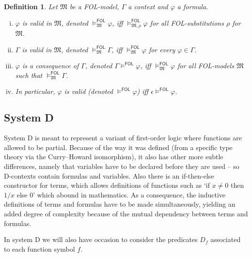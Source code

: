 \documentclass{article}
\newtheorem{definition}{Definition}[section]
\newcommand{\D}{\textsf D}
\newcommand{\FOL}{\textsf{FOL}}
\newcommand{\ifte}{\textsf{if-then-else}}
\newcommand{\mymodels}[1]{\ensuremath{\models^{\mathsf{#1}}}}
\newcommand{\mymodelsm}[2]{\ensuremath{\models_{\mathfrak{#2}}^{\mathsf{#1}}}}
\newcommand{\mymodelss}[3]{\ensuremath{\models_{\mathfrak{#2},{#3}}^{\mathsf{#1}}}}
\newcommand{\yields}[1]{\ensuremath{\models^{\mathsf{#1}}}}
\begin{document}
\begin{definition}\label{defn:FOLvalidity}\label{defn:FOLconsequence}
Let $\mathfrak M$ be a {\FOL}-model, $\Gamma$ a context and $\varphi$
a formula.
\begin{enumerate}[(i)]
\item $\varphi$ is valid in $\mathfrak M$, denoted
$\mymodelsm{FOL}M\varphi$, iff $\mymodelss{FOL}M\rho\varphi$ for all
{\FOL}-substitutions $\rho$ for $\mathfrak M$.
\item $\Gamma$ is valid in $\mathfrak M$, denoted
$\mymodelsm{FOL}M\Gamma$, iff $\mymodelsm{FOL}M\varphi$ for every
$\varphi\in\Gamma$.
\item $\varphi$ is a consequence of $\Gamma$, denoted
$\Gamma\yields{FOL}\varphi$, iff $\mymodelsm{FOL}M\varphi$ for all
{\FOL}-models $\mathfrak M$ such that $\mymodelsm{FOL}M\Gamma$.
\item In particular, $\varphi$ is valid (denoted $\mymodels{FOL}\varphi$)
iff $\epsilon\yields{FOL}\varphi$.
\end{enumerate}
\end{definition}

\subsection{System {\D}}

System {\D} is meant to represent a variant of first-order logic where
functions are allowed to be partial.  Because of the way it was defined
(from a specific type theory via the Curry--Howard isomorphism), it also
has other more subtle differences, namely that variables have to be
declared before they are used -- so {\D}-contexts contain formulas and
variables.  Also there is an {\ifte} constructor for terms, which
allows definitions of functions such as `if $x\neq 0$ then $1/x$ else $0$'
which abound in mathematics.  As a consequence, the inductive
definitions of terms and formulas have to be made simultaneously,
yielding an added degree of complexity because of the mutual
dependency between terms and formulas.

In system {\D} we will also have occasion to consider the
predicates $D_f$ associated to each function symbol $f$.
\end{document}
